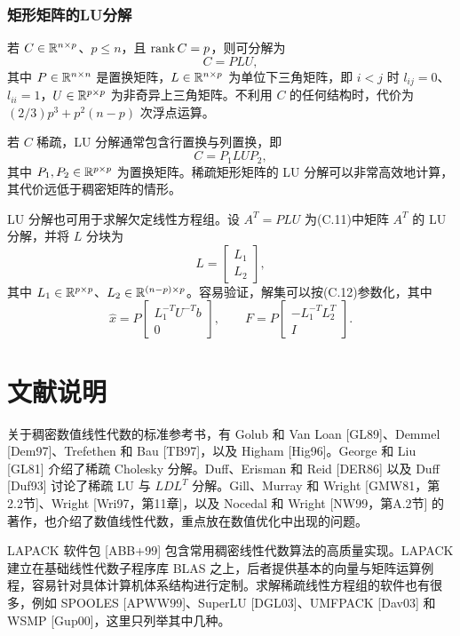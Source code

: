 \subsubsection*{矩形矩阵的LU分解}
若 $C\in\mathbb R^{n\times p}$、$p\leq n$，且 $\operatorname{rank} C=p$，则可分解为
\[
 C=PLU,
\]
其中 $P\in\mathbb R^{n\times n}$ 是置换矩阵，$L\in\mathbb R^{n\times p}$ 为单位下三角矩阵，即 $i<j$ 时 $l_{ij}=0$、$l_{ii}=1$，$U\in\mathbb R^{p\times p}$ 为非奇异上三角矩阵。不利用 $C$ 的任何结构时，代价为 $(2/3)p^3+p^2(n-p)$ 次浮点运算。

若 $C$ 稀疏，LU 分解通常包含行置换与列置换，即
\[
 C=P_1LUP_2,
\]
其中 $P_1,P_2\in\mathbb R^{p\times p}$ 为置换矩阵。稀疏矩形矩阵的 LU 分解可以非常高效地计算，其代价远低于稠密矩阵的情形。

LU 分解也可用于求解欠定线性方程组。设 $A^T=PLU$ 为(C.11)中矩阵 $A^T$ 的 LU 分解，并将 $L$ 分块为
\[
 L=\begin{bmatrix}L_1\\L_2\end{bmatrix},
\]
其中 $L_1\in\mathbb R^{p\times p}$、$L_2\in\mathbb R^{(n-p)\times p}$。容易验证，解集可以按(C.12)参数化，其中
\[
 \hat x=P\begin{bmatrix}L_1^{-T}U^{-T}b\\0\end{bmatrix},\qquad
 F=P\begin{bmatrix}-L_1^{-T}L_2^T\\I\end{bmatrix}.
\]

\section*{文献说明}
关于稠密数值线性代数的标准参考书，有 Golub 和 Van Loan [GL89]、Demmel [Dem97]、Trefethen 和 Bau [TB97]，以及 Higham [Hig96]。George 和 Liu [GL81] 介绍了稀疏 Cholesky 分解。Duff、Erisman 和 Reid [DER86] 以及 Duff [Duf93] 讨论了稀疏 LU 与 $LDL^T$ 分解。Gill、Murray 和 Wright [GMW81，第2.2节]、Wright [Wri97，第11章]，以及 Nocedal 和 Wright [NW99，第A.2节] 的著作，也介绍了数值线性代数，重点放在数值优化中出现的问题。

LAPACK 软件包 [ABB+99] 包含常用稠密线性代数算法的高质量实现。LAPACK 建立在基础线性代数子程序库 BLAS 之上，后者提供基本的向量与矩阵运算例程，容易针对具体计算机体系结构进行定制。求解稀疏线性方程组的软件也有很多，例如 SPOOLES [APWW99]、SuperLU [DGL03]、UMFPACK [Dav03] 和 WSMP [Gup00]，这里只列举其中几种。

